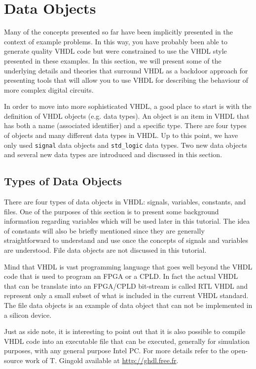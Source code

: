 %
%
%
\chapter{Data Objects}

Many of the concepts presented so far have been implicitly presented in the context of example problems. In this way, you have probably been able to generate quality VHDL code but were constrained to use the VHDL style presented in these examples. In this section, we will present some of the underlying details and theories that surround VHDL as a backdoor approach for presenting tools that will allow you to use VHDL for describing the behaviour of more complex digital circuits.

In order to move into more sophisticated VHDL, a good place to start is with the definition of VHDL objects (e.g. data types). An object is an item in VHDL that has both a name (associated identifier) and a specific type. There are four types of objects and many different data types in VHDL. Up to this point, we have only used \texttt{signal} data objects and \texttt{std\_logic} data types. Two new data objects and several new data types are introduced and discussed in this section.

\section{Types of Data Objects}
There are four types of data objects in VHDL: signals, variables, constants, and files. One of the purposes of this section is to present some background information regarding variables which will be used later in this tutorial. The idea of constants will also be briefly mentioned since they are generally straightforward to understand and use once the concepts of signals and variables are understood. File data objects are not discussed in this tutorial. 

Mind that VHDL is vast programming language that goes well beyond the VHDL code that is used to program an FPGA or a CPLD. In fact the actual VHDL that can be translate into an FPGA/CPLD bit-stream is called RTL VHDL and represent only a small subset of what is included in the current VHDL standard. The file  data objects is an example of data object that can not be implemented in a silicon device.

Just as side note, it is interesting to point out that it is also possible to compile VHDL code into an executable file that can be executed, generally for simulation purposes, with any general purpose Intel PC. For more details refer to the open-source work of T. Gingold available at \url{http://ghdl.free.fr}.

